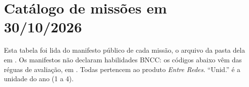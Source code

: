 \chapter{Catálogo de missões em 30/10/2026}
\label{ap:catalogo}

Esta tabela foi lida do manifesto público de cada missão, o arquivo
 da pasta dela em .
Os manifestos não declaram habilidades BNCC: os códigos abaixo vêm das réguas
de avaliação, em . Todas
pertencem ao produto \emph{Entre Redes}. ``Unid.'' é a unidade do ano (1 a 4).

